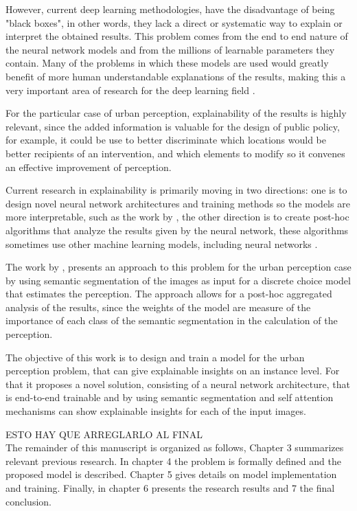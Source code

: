 However, current deep learning methodologies, have the disadvantage of being "black boxes", in other
words, they lack a direct or systematic way to explain or interpret the obtained results. This problem
comes from the end to end nature of the neural network models and from the millions of learnable parameters
they contain. Many of the problems in which these models are used would greatly benefit of more
human understandable explanations of the results, making this a very important area of
research for the deep learning field \cite{adadi_xai}.

For the particular case of urban perception, explainability of the results is highly relevant, since
the added information is valuable for the design of public policy, for example, it could be use to
better discriminate which locations would be better recipients of an intervention, and which elements
to modify so it convenes an effective improvement of perception.

Current research in explainability is primarily moving in two directions: one is to design novel neural network architectures and training methods so
the models are more interpretable, such as the work by , the other
direction is to  create post-hoc algorithms \cite{adadi_xai} that analyze the results given by the
neural network, these algorithms sometimes use other machine learning models, including neural networks \cite{kim_ace}.

The work by , presents an approach to this problem for the urban perception case
by using semantic segmentation of the images \cite{segnet} as input for a discrete choice model that
estimates the perception. The approach allows for a post-hoc aggregated analysis of the results, since
the weights of the model are measure of the importance of each class of the semantic segmentation in the
calculation of the perception.

The objective of this work is to design and train a model for the urban perception problem,
that can give explainable insights on an instance level. For that it proposes a novel solution,
consisting of a neural network architecture, that is end-to-end trainable and by using semantic
segmentation \cite{pspnet} and self attention mechanisms \cite{vaswani_attention} can show
explainable insights for each of the input images.

ESTO HAY QUE ARREGLARLO AL FINAL \\
The remainder of this manuscript is organized as follows, Chapter 3 summarizes relevant previous research. In chapter 4
the problem is formally defined and the proposed model is described. Chapter 5 gives
details on model implementation and training. Finally, in chapter 6 presents the research results
and 7 the final conclusion.
